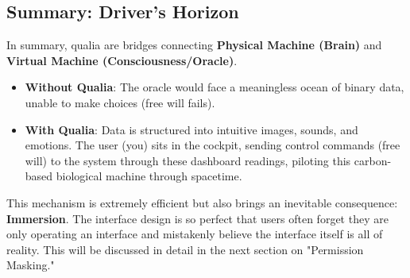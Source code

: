 \subsection{Summary: Driver's Horizon}

In summary, qualia are bridges connecting \textbf{Physical Machine (Brain)} and \textbf{Virtual Machine (Consciousness/Oracle)}.

\begin{itemize}
\item \textbf{Without Qualia}: The oracle would face a meaningless ocean of binary data, unable to make choices (free will fails).

\item \textbf{With Qualia}: Data is structured into intuitive images, sounds, and emotions. The user (you) sits in the cockpit, sending control commands (free will) to the system through these dashboard readings, piloting this carbon-based biological machine through spacetime.
\end{itemize}

This mechanism is extremely efficient but also brings an inevitable consequence: \textbf{Immersion}. The interface design is so perfect that users often forget they are only operating an interface and mistakenly believe the interface itself is all of reality. This will be discussed in detail in the next section on "Permission Masking."
